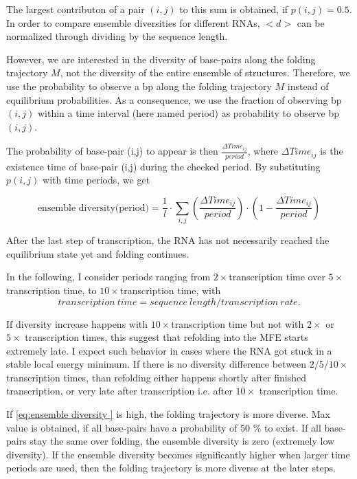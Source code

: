 \documentclass[ twoside,openright,titlepage,numbers=noenddot,headinclude,%
                footinclude=false, cleardoublepage=empty,abstractoff, %
                BCOR=5mm,paper=a4,fontsize=11pt,%
                ngerman,american,%
                ]{scrreprt}
\begin{document}
The largest contributon of a pair $(i,j)$ to this sum is obtained, if
$p(i,j)=0.5$.
In order to compare ensemble diversities for different RNAs,
$<d>$ can be normalized through dividing by the sequence length.

However, we are interested in the diversity of base-pairs along the folding
trajectory $M$, not the diversity of the entire ensemble of
structures. Therefore, we use the probability to observe a bp along the
folding trajectory $M$ instead of equilibrium probabilities. 
As a consequence, we use the fraction of observing bp $(i,j)$ within a
time interval (here named period) as probability to observe bp $(i,j)$.

The probability of base-pair (i,j) to appear is then $\frac{\Delta Time_{ij}}{period}$, where $\Delta Time_{ij}$ is the existence time of base-pair
(i,j) during the checked period. By substituting $p(i,j)$ with time
periods, we get

\begin{equation}
\mbox{ensemble diversity(period)} = \frac{1}{l} \cdot \sum\limits_{i,j} (\frac{\Delta Time_{ij}}{period})\cdot (1- \frac{\Delta Time_{ij}}{period})  
\label{eq:ensemble diversity }
\end{equation}

After the last step of transcription, the RNA has not necessarily reached
the equilibrium state yet and folding continues.

In the following, I consider periods ranging from $2\times$transcription time over
$5\times$transcription time, to $10\times$transcription time, with
\begin{equation}
  transcription\ time = {sequence\ length} / {transcription\ rate}.
\end{equation}

If diversity increase happens with $10\times$transcription time but not with $2\times$ or $5\times$ transcription times, this suggest that refolding into the
MFE starts extremely late. I expect such behavior in cases where the RNA
got stuck in a stable local energy minimum. If there is no diversity difference between
$2/5/10\times$ transcription times, than refolding either happens shortly
after finished transcription, or very late after transcription i.e. after
$10\times$ transcription time.


If \ref{eq:ensemble diversity } is high, the folding trajectory is more diverse. Max value is obtained, if all base-pairs have a probability of 50 \% to exist. If all base-pairs stay the same over folding, the ensemble diversity is zero (extremely low diversity).
If the ensemble diversity becomes significantly higher when larger time periods are
used, then the folding trajectory is more diverse at the later steps.
\end{document}
